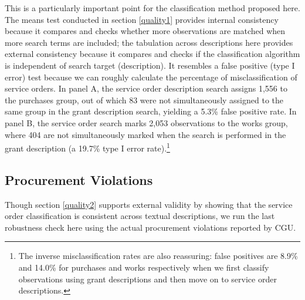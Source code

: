 \documentclass[]{article}
\let\rmarkdownfootnote\footnote%
\def\footnote{\protect\rmarkdownfootnote}
\theoremstyle{definition}
\theoremstyle{definition}
\theoremstyle{definition}
\theoremstyle{remark}
\begin{document}
This is a particularly important point for the classification method
proposed here. The means test conducted in section \ref{quality1}
provides internal consistency because it compares and checks whether
more observations are matched when more search terms are included; the
tabulation across descriptions here provides external consistency
because it compares and checks if the classification algorithm is
independent of search target (description). It resembles a false
positive (type I error) test because we can roughly calculate the
percentage of misclassification of service orders. In panel A, the
service order description search assigns 1,556 to the purchases group,
out of which 83 were not simultaneously assigned to the same group in
the grant description search, yielding a 5.3\% false positive rate. In
panel B, the service order search marks 2,053 observations to the works
group, where 404 are not simultaneously marked when the search is
performed in the grant description (a 19.7\% type I error
rate).\footnote{The inverse misclassification rates are also reassuring:
  false positives are 8.9\% and 14.0\% for purchases and works
  respectively when we first classify observations using grant
  descriptions and then move on to service order descriptions.}

\hypertarget{quality3}{%
\subsection{Procurement Violations}\label{quality3}}

Though section \ref{quality2} supports external validity by showing that
the service order classification is consistent across textual
descriptions, we run the last robustness check here using the actual
procurement violations reported by CGU.
\end{document}
